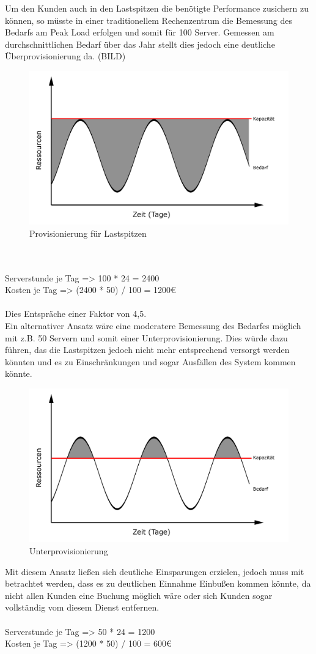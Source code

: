 Um den Kunden auch in den Lastspitzen die benötigte Performance zusichern zu können, so müsste in einer traditionellem Rechenzentrum die Bemessung des Bedarfs am Peak Load erfolgen und somit für 100 Server. Gemessen am durchschnittlichen Bedarf über das Jahr stellt dies jedoch eine deutliche Überprovisionierung da. (BILD)
	\begin{figure}[h]
		\centering
		\includegraphics[width=0.7\linewidth]{images/overprovisioning}
		\caption{Provisionierung für Lastspitzen}
		\label{fig:overprovisioning}
	\end{figure}
\\ 
\\
Serverstunde je Tag => 100 * 24 = 2400 \\
Kosten je Tag => (2400 * 50) / 100 = 1200€ \\ 
\\
Dies Entspräche einer Faktor von 4,5.
\\
Ein alternativer Ansatz wäre eine moderatere Bemessung des Bedarfes möglich mit z.B. 50 Servern und somit einer Unterprovisionierung. Dies würde dazu führen, das die Lastspitzen jedoch nicht mehr entsprechend versorgt werden könnten und es zu Einschränkungen und sogar Ausfällen des System kommen könnte. 
	\begin{figure}[h]
		\centering
		\includegraphics[width=0.7\linewidth]{images/underprovisioning}
		\caption{Unterprovisionierung}
		\label{fig:underprovisioning}
	\end{figure}
Mit diesem Ansatz ließen sich deutliche Einsparungen erzielen, jedoch muss mit betrachtet werden, dass es zu deutlichen Einnahme Einbußen kommen könnte, da nicht allen Kunden eine Buchung möglich wäre oder sich Kunden sogar vollständig vom diesem Dienst entfernen.
\\
\\
Serverstunde je Tag => 50 * 24 = 1200 \\
Kosten je Tag => (1200 * 50) / 100 = 600€ \\
\\ 

